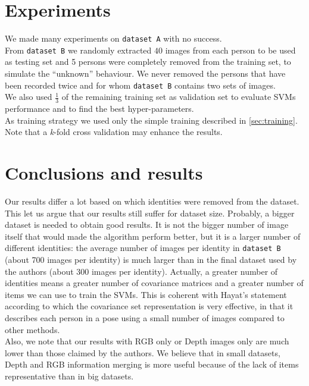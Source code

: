 \documentclass{article}
\begin{document}
\section{Experiments}
We made many experiments on \verb|dataset A| with no success. \\
From \verb|dataset B| we randomly extracted $40$ images from each person to be
used as testing set and 5 persons were completely removed from the training
set, to simulate the ``unknown'' behaviour. We never removed the persons that
have been recorded twice and for whom \verb|dataset B| contains two sets of
images. \\
We also used $\frac{1}{3}$ of the remaining training set as validation set to
evaluate SVMs performance and to find the best hyper-parameters. \\
As training strategy we used only the simple training described in
\ref{sec:training}. Note that a \textit{k}-fold cross validation may enhance
the results.

\section{Conclusions and results}
Our results differ a lot based on which identities were removed from the dataset. \\
This let us argue that our results still suffer for dataset size. Probably, a bigger dataset is needed to obtain good results. It is not the bigger number of image itself that would made the algorithm perform better, but it is a larger number of different identities: the average number of images per identity in \verb|dataset B| (about 700 images per identity) is much larger than in the final dataset used by the authors (about 300 images per identity). Actually, a greater number of identities means a greater number of covariance matrices and a greater number of items we can use to train the SVMs. This is coherent with Hayat's statement according to which the covariance set representation is very effective, in that it describes each person in a pose using a small number of images compared to other methods. \\

Also, we note that our results with RGB only or Depth images only are much lower than those claimed by the authors. We believe that in small datasets, Depth and RGB information merging is more useful because of the lack of items representative than in big datasets. \\
\end{document}
